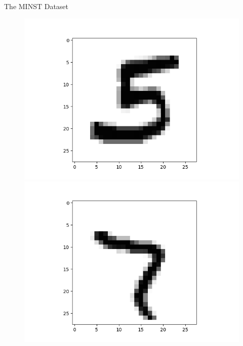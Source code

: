 \documentclass[titlepage,leqno]{beamer}%
\begin{document}
\begin{frame}{The MINST Dataset}
\begin{figure}[h]
  \centering
    \begin{minipage}[t]{0.3\textwidth}
        \includegraphics[width=\textwidth]{img786render.png}
    \end{minipage}
    \begin{minipage}[t]{0.3\textwidth}
        \includegraphics[width=\textwidth]{img98render.png}

\end{minipage}
\end{figure}
\end{frame}
\end{document}
